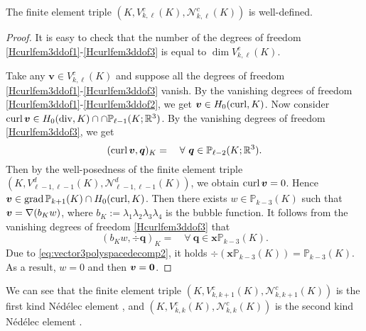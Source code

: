 \begin{lemma}\label{lem:unisovlenHdivfem}
The finite element triple $(K, V_{k,\ell}^c(K), \mathcal N_{k,\ell}^c(K))$ is well-defined.
\end{lemma}
\begin{proof}
It is easy to check that the number of the degrees of freedom \eqref{Hcurlfem3ddof1}-\eqref{Hcurlfem3ddof3}  is equal to $\dim V_{k,\ell}^c(K)$.


Take any $\boldsymbol v\in V_{k,\ell}^c(K)$ and
suppose all the degrees of freedom \eqref{Hcurlfem3ddof1}-\eqref{Hcurlfem3ddof3} vanish. 
By the vanishing degrees of freedom \eqref{Hcurlfem3ddof1}-\eqref{Hcurlfem3ddof2}, we get $\boldsymbol v\in H_0(\operatorname{curl}, K)$. 
Now consider $\operatorname{curl}\boldsymbol v\in H_0(\operatorname{div}, K)\cap\cap \mathbb P_{\ell-1}(K;\mathbb R^3)$.
By the vanishing degrees of freedom \eqref{Hcurlfem3ddof3}, we get 
\[
(\operatorname{curl}\boldsymbol v, \boldsymbol q)_K = \quad\forall~\boldsymbol q\in\mathbb P_{\ell-2}(K; \mathbb R^3).
\]
Then by the well-posedness of the finite element triple $(K, V_{\ell-1,\ell-1}^d(K), \mathcal N_{\ell-1,\ell-1}^d(K))$, we obtain $\operatorname{curl}\boldsymbol v=0$. Hence $\boldsymbol v\in \operatorname{grad}\mathbb P_{k+1}(K)\cap H_0(\operatorname{curl}, K)$. Then there exists $w\in\mathbb P_{k-3}(K)$ such that $\boldsymbol v=\nabla(b_Kw)$, where $b_K:=\lambda_1\lambda_2\lambda_3\lambda_4$ is the bubble function.
It follows from the vanishing degrees of freedom \eqref{Hcurlfem3ddof3} that
\[
(b_Kw, \div\boldsymbol q)_K = \quad\forall~\boldsymbol q\in\boldsymbol x\mathbb P_{k-3}(K).
\]
Due to \eqref{eq:vector3polyspacedecomp2},  it holds $\div(\boldsymbol x\mathbb P_{k-3}(K))=\mathbb P_{k-3}(K)$. As a result, $w=0$ and then $\boldsymbol v=\boldsymbol 0$.
\end{proof}

We can see that the finite element triple $(K, V_{k,k+1}^c(K), \mathcal N_{k,k+1}^c(K))$ is the first kind N\'ed\'elec element \cite{Nedelec1980}, and $(K, V_{k,k}^c(K), \mathcal N_{k,k}^c(K))$ is the second kind N\'ed\'elec  element \cite{Nedelec1986}.

